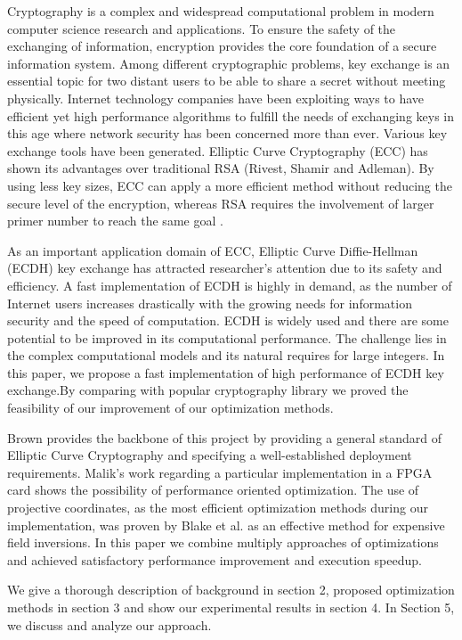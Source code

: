 Cryptography is a complex and widespread computational problem in modern computer science research and applications. To ensure the safety of the exchanging of information, encryption provides the core foundation of a secure information system. Among different cryptographic problems, key exchange is an essential topic for two distant users to be able to share a secret without meeting physically. Internet technology companies have been exploiting ways to have efficient yet high performance algorithms to fulfill the needs of exchanging keys in this age where network security has been concerned more than ever. Various key exchange tools have been generated. Elliptic Curve Cryptography (ECC) has shown its advantages over traditional RSA (Rivest, Shamir and Adleman). By using less key sizes, ECC can apply a more efficient method without reducing the secure level of the encryption, whereas RSA requires the involvement of larger primer number to reach the same goal \cite{Malik:2010}. 

As an important application domain of ECC, Elliptic Curve Diffie-Hellman (ECDH) key exchange has attracted researcher's attention due to its safety and efficiency. A fast implementation of ECDH is highly in demand, as the number of Internet users increases drastically with the growing needs for information security and the speed of computation. ECDH is widely used and there are some potential to be improved in its computational performance. The challenge lies in the complex computational models and its natural requires for large integers. In this paper, we propose a fast implementation of high performance of ECDH key exchange.By comparing with popular cryptography library we proved the feasibility of our improvement of our optimization methods.  

Brown provides the backbone of this project by providing a general standard of Elliptic Curve Cryptography\cite{Brown:2009} and specifying a well-established deployment requirements. Malik's work regarding a particular implementation in a FPGA card \cite{Malik:2010} shows the possibility of performance oriented optimization. The use of projective coordinates, as the most efficient optimization methods during our implementation, was proven by Blake et al.\cite{Blake:1999} as an effective method for expensive field inversions. In this paper we combine multiply approaches of optimizations and achieved satisfactory performance improvement and execution speedup.  

We give a thorough description of background in section 2, proposed optimization methods in section 3 and show our experimental results in section 4. In Section 5, we discuss and analyze our approach.